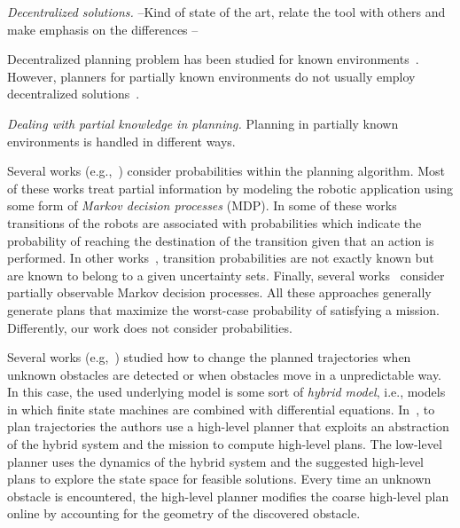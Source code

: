 \emph{Decentralized solutions.}
--Kind of state of the art, relate the tool with others and make emphasis on the differences --

Decentralized planning problem has been studied for known environments~\cite{schillinger2016decomposition,guo2015multi,tumova2016multi}.
However, planners for partially known environments do not usually employ decentralized solutions~\cite{roy2006planning,du2012robot,diaz2001exploring}. 

\emph{Dealing with partial knowledge in planning.}
Planning in partially known environments is handled in different ways. 
\begin{enumerate*}
\item Several works (e.g.,~\cite{ding2011ltl,kurniawati2011motion,wolff2012robust,du2012robot,Roy2006,chen2012ltl,nikou2017probabilistic,7078886,7139350,narayanan2015task}) consider probabilities within the planning algorithm.
Most of these works  treat partial information by modeling the robotic application using some form of \emph{Markov decision processes} (MDP).
In some of these works~\cite{ding2011ltl,chen2012ltl} transitions of the robots are associated with probabilities which indicate the probability of reaching the destination of the transition given that an action is performed.
In other works~\cite{wolff2012robust}, transition probabilities are not exactly known but are known to belong to a given uncertainty sets.
Finally, several works~\cite{kurniawati2011motion,Roy2006} consider partially observable Markov decision processes.
All these approaches generally generate plans that maximize the worst-case probability of satisfying a mission.
Differently, our work does not consider probabilities.
\item Several works (e.g,~\cite{lahijanian2016iterative,livingston2012backtracking,l2014safety,nie2016searching,7139412}) studied how to change the planned trajectories when unknown obstacles are detected or when obstacles move in a unpredictable way.
In this case, the used underlying model is some sort of \emph{hybrid model}, i.e., models in which finite state machines are combined with differential equations. 
In~\cite{lahijanian2016iterative}, to plan trajectories the authors use a high-level planner that exploits an abstraction of the hybrid system and the mission to compute high-level plans. 
The low-level planner uses the dynamics of the hybrid system and the suggested high-level plans to explore the state space for feasible solutions.
Every time an unknown obstacle is encountered, the high-level planner modifies the coarse high-level plan online by accounting for the geometry of the discovered obstacle. 

\end{enumerate*}
